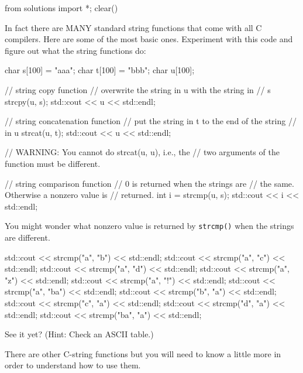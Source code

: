 \begin{python0}
from solutions import *; clear()
\end{python0}

In fact there are MANY standard string functions that come with all C compilers. Here are some of the most basic ones. Experiment with this code and figure out what the string functions do:

\begin{consolethree}[escapeinside=||]
char s[100] = "aaa";
char t[100] = "bbb";
char u[100];

// string copy function
// overwrite the string in u with the string in
// s
strcpy(u, s);
std::cout << u << std::endl;

// string concatenation function
// put the string in t to the end of the string
// in u
strcat(u, t);
std::cout << u << std::endl;

// WARNING: You cannot do strcat(u, u), i.e., the
// two arguments of the function must be different.

// string comparison function
// 0 is returned when the strings are
// the same. Otherwise a nonzero value is
// returned.
int i = strcmp(u, s);
std::cout << i << std::endl;
\end{consolethree}

You might wonder what nonzero value is returned by \texttt{strcmp()} when the strings are different.

\begin{consolethree}[escapeinside=||]
std::cout << strcmp("a", "b") << std::endl;
std::cout << strcmp("a", "c") << std::endl;
std::cout << strcmp("a", "d") << std::endl;
std::cout << strcmp("a", "z") << std::endl;
std::cout << strcmp("a", "!") << std::endl;
std::cout << strcmp("a", "ba") << std::endl;
std::cout << strcmp("b", "a") << std::endl;
std::cout << strcmp("c", "a") << std::endl;
std::cout << strcmp("d", "a") << std::endl;
std::cout << strcmp("ba", "a") << std::endl;
\end{consolethree}

See it yet? (Hint: Check an ASCII table.)

There are other C-string functions but you will need to know a little more in order to understand how to use them.


